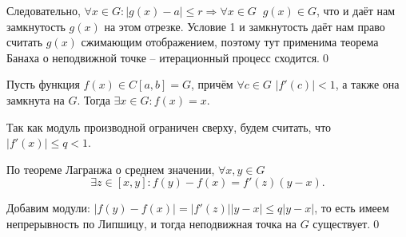 \documentclass[../main.tex]{subfile}
\begin{document}
	Следовательно, $\forall x\in G: |g(x)-a|\le r\Rightarrow\forall x\in G\;\;g(x)\in G$,
	что и даёт нам замкнутость $g(x)$ на этом отрезке. Условие 1 и замкнутость
	даёт нам право считать $g(x)$ сжимающим отображением, поэтому тут применима
	теорема Банаха о неподвижной точке -- итерационный процесс сходится.\qed\newline

\begin{corollary}
	Пусть функция $f(x)\in C[a,b]=G$, причём $\forall c\in G$ $|f'(c)|<1$,
	а также она замкнута на $G$. Тогда $\exists x\in G: f(x)=x$.
\end{corollary}

\beginproof

	Так как модуль производной ограничен сверху, будем считать, что $|f'(x)|\le q<1$.

	По теореме Лагранжа о среднем значении, $\forall x,y\in G$ \\
	\[\exists z\in[x,y]: f(y)-f(x)=f'(z)(y-x).\]

	Добавим модули: $|f(y)-f(x)|=|f'(z)||y-x|\le q|y-x|$, то есть имеем
	непрерывность по Липшицу, и тогда неподвижная точка на $G$ существует.\qed
\end{document}
